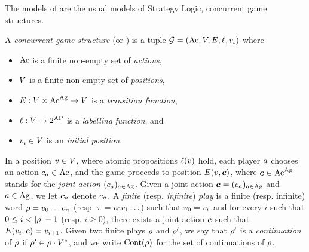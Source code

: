 The models of \SLref are the usual models of Strategy Logic, \ie concurrent game structures. 

\begin{definition}%
  \label{def-CGS}
  A \emph{concurrent game structure} (or
  \CGS) is a tuple
  $\CGS=(\Act,\setpos,\trans,\val,\pos_\init)$ where
   \begin{itemize}
    \item $\textnormal{Ac}$ is a finite non-empty set of \emph{actions},
    \item $V$ is a finite non-empty set of \emph{positions},
   \item $E:V\times \textnormal{Ac}^{\textnormal{Ag}}\to V$ is a \emph{transition function}, 
  \item $\ell:V\to 2^{\textnormal{AP}}$ is a \emph{labelling function}, and
  \item $v_{\iota} \in V$ is an \emph{initial position}.
  \end{itemize}
\end{definition}


In a position $v\in V$, where atomic propositions $\ell(v)$
hold, each player $a$ chooses an action $c_a\in\textnormal{Ac}$, 
and the game proceeds to position
$E(v, \bm{c})$, where $\bm{c}\in \textnormal{Ac}^{\textnormal{Ag}}$ stands for the \emph{joint action}
$(c_a)_{a\in\textnormal{Ag}}$. Given a joint action
$\bm{c}=(c_a)_{a\in\textnormal{Ag}}$ and $a\in\textnormal{Ag}$, we let
$\bm{c}_{a}$ denote $c_a$.
A \emph{finite} (resp. \emph{infinite}) \emph{play} is a finite (resp. infinite)
word $\rho=v_{0}\ldots v_{n}$ (resp. $\pi=v_{0} v_{1}\ldots$)
such that $v_0=v_{\iota}$ and for every $i$ such that $0\leq i<|\fplay|-1$ (resp. $i\geq 0$), there exists a joint action $\bm{c}$
such that $E(v_{i}, \bm{c})=v_{i+1}$.
Given two finite plays $\rho$ and $\rho'$, we say that $\rho'$
is a \emph{continuation} of $\rho$ if $\rho'\in\rho\cdot
V^*$, and we write $\text{Cont}(\rho)$ for the set of
continuations of $\rho$.

